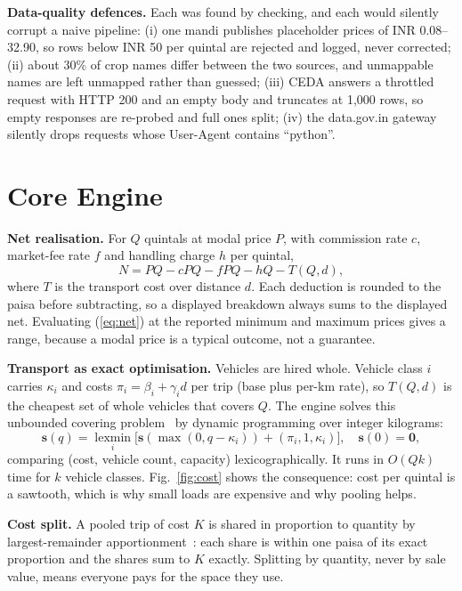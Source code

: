 \documentclass[conference]{IEEEtran}
\begin{document}
\textbf{Data-quality defences.} Each was found by checking, and each
would silently corrupt a naive pipeline: (i) one mandi publishes
placeholder prices of INR 0.08--32.90, so rows below INR 50 per quintal
are rejected and logged, never corrected; (ii) about 30\% of crop names
differ between the two sources, and unmappable names are left unmapped
rather than guessed; (iii) CEDA answers a throttled request with HTTP 200
and an empty body and truncates at 1,000 rows, so empty responses are
re-probed and full ones split; (iv) the data.gov.in gateway silently drops
requests whose User-Agent contains ``python''.

\section{Core Engine}
\label{sec:engine}
\textbf{Net realisation.} For $Q$ quintals at modal price $P$, with
commission rate $c$, market-fee rate $f$ and handling charge $h$ per
quintal,
\begin{equation}
N = PQ - cPQ - fPQ - hQ - T(Q,d),
\label{eq:net}
\end{equation}
where $T$ is the transport cost over distance $d$. Each deduction is
rounded to the paisa before subtracting, so a displayed breakdown always
sums to the displayed net. Evaluating (\ref{eq:net}) at the reported
minimum and maximum prices gives a range, because a modal price is a
typical outcome, not a guarantee.

\textbf{Transport as exact optimisation.} Vehicles are hired whole.
Vehicle class $i$ carries $\kappa_i$ and costs $\pi_i = \beta_i +
\gamma_i d$ per trip (base plus per-km rate), so $T(Q,d)$ is the cheapest
set of whole vehicles that covers $Q$. The engine solves this unbounded
covering problem~\cite{martello} by dynamic programming over integer
kilograms:
\begin{equation}
\mathbf{s}(q) = \operatorname*{lexmin}_{i}\big[\mathbf{s}(\max(0,q-\kappa_i))
+ (\pi_i, 1, \kappa_i)\big], \quad \mathbf{s}(0) = \mathbf{0},
\label{eq:dp}
\end{equation}
comparing (cost, vehicle count, capacity) lexicographically. It runs in
$O(Qk)$ time for $k$ vehicle classes. Fig.~\ref{fig:cost} shows the
consequence: cost per quintal is a sawtooth, which is why small loads are
expensive and why pooling helps.

\textbf{Cost split.} A pooled trip of cost $K$ is shared in proportion to
quantity by largest-remainder apportionment~\cite{balinski}: each share
is within one paisa of its exact proportion and the shares sum to $K$
exactly. Splitting by quantity, never by sale value, means everyone pays
for the space they use.
\end{document}
